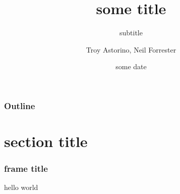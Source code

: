 \documentclass{beamer}
\title{some title}
\subtitle{subtitle}
\author{Troy Astorino, Neil Forrester}
\date{some date}
\institute[6.834 -- MIT]{Cognitive Robotics \\ Massachusetts Institute of Technology}
\begin{document}
\begin{frame}
	\maketitle
\end{frame}

\begin{frame}
	\frametitle{Outline}
	\tableofcontents
\end{frame}

\section{section title}
\begin{frame}
	\frametitle{frame title}
	hello world
\end{frame}
\end{document}
